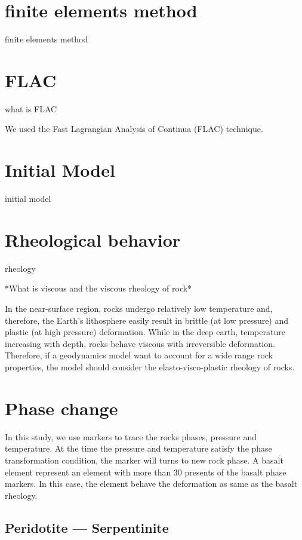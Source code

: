 \section{finite elements method}

finite elements method

\section{FLAC}

what is FLAC

We used the Fast Lagrangian Analysis of Continua (FLAC) technique.

\section{Initial Model}

initial model

\section{Rheological behavior}

rheology

*What is viscous and the viscous rheology of rock*

In the near-surface region, rocks undergo relatively low temperature and, therefore, the Earth's lithosphere easily result in brittle (at low pressure) and plastic (at high pressure) deformation. 
While in the deep earth, temperature increasing with depth, rocks behave viscous with irreversible deformation. 
Therefore, if a geodynamics model want to account for a wide range rock properties, the model should consider the elasto-visco-plastic rheology of rocks.

\section{Phase change}

In this study, we use markers to trace the rocks phases, pressure and temperature. 
At the time the pressure and temperature satisfy the phase transformation condition, the marker will turns to new rock phase. 
A basalt element represent an element with more than 30 presents of the basalt phase markers. 
In this case, the element behave the deformation as same as the basalt rheology.

\subsection{Peridotite --- Serpentinite}

